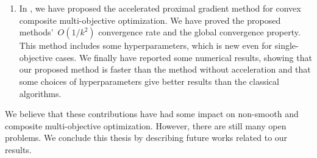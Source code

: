 \documentclass[../main]{subfiles}
\begin{document}
\begin{enumerate}
    \item In , we have proposed the accelerated proximal gradient method for convex composite multi-objective optimization.
          We have proved the proposed methods'~$O(1 / k^2)$ convergence rate and the global convergence property.
          This method includes some hyperparameters, which is new even for single-objective cases.
          We finally have reported some numerical results, showing that our proposed method is faster than the method without acceleration and that some choices of hyperparameters give better results than the classical algorithms.
\end{enumerate}

We believe that these contributions have had some impact on non-smooth and composite multi-objective optimization.
However, there are still many open problems.
We conclude this thesis by describing future works related to our results.
\end{document}
